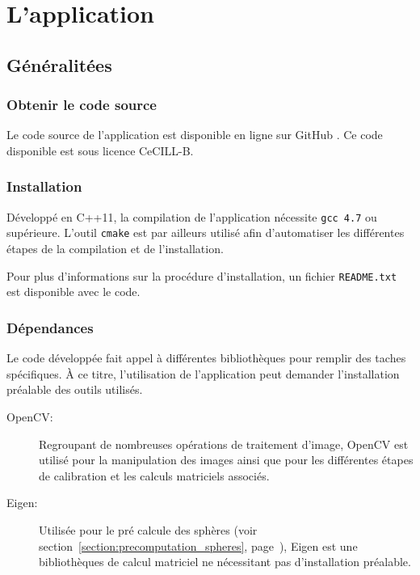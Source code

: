 \documentclass[10pt,a4paper,twoside, twocolumn]{report}
\begin{document}
\chapter{L’application}




\section{Généralitées}
\subsection{Obtenir le code source}

Le code source de l’application est disponible en ligne sur GitHub . Ce code disponible est sous licence CeCILL-B.


\subsection{Installation}

Développé en C++11, la compilation de l’application nécessite \texttt{gcc 4.7} ou supérieure. L’outil \texttt{cmake} est par ailleurs utilisé afin d’automatiser les différentes étapes de la compilation et de l’installation.

Pour plus d’informations sur la procédure d’installation, un fichier \texttt{README.txt} est disponible avec le code.

\subsection{Dépendances}

Le code développée fait appel à différentes bibliothèques pour remplir des taches spécifiques. À ce titre, l’utilisation de l’application peut demander l’installation préalable des outils utilisés.

\begin{description}
	\item[OpenCV:] Regroupant de nombreuses opérations de traitement d’image, OpenCV est utilisé pour la manipulation des images ainsi que pour les différentes étapes de calibration et les calculs matriciels associés.
	\item[Eigen:] Utilisée pour le pré calcule des sphères (voir section~\ref{section:precomputation_spheres}, page~\pageref{section:precomputation_spheres}), Eigen est une bibliothèques de calcul matriciel ne nécessitant pas d’installation préalable.
\end{description}
\end{document}
